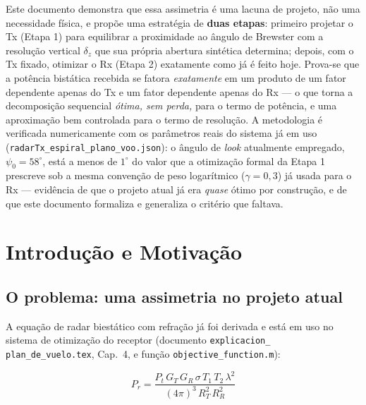 \documentclass[12pt,a4paper,oneside]{book}
\theoremstyle{definition}
\theoremstyle{remark}
\newcommand{\RT}{R_T}
\newcommand{\RR}{R_R}
\newcommand{\Prcv}{P_r}
\newcommand{\Pt}{P_t}
\newcommand{\dz}{\delta_z}
\begin{document}
Este documento demonstra que essa assimetria é uma lacuna de projeto, não uma
necessidade física, e propõe uma estratégia de \textbf{duas etapas}: primeiro
projetar o Tx (Etapa 1) para equilibrar a proximidade ao ângulo de Brewster
com a resolução vertical $\dz$ que sua própria abertura sintética determina;
depois, com o Tx fixado, otimizar o Rx (Etapa 2) exatamente como já é feito
hoje. Prova-se que a potência bistática recebida se fatora
\emph{exatamente} em um produto de um fator dependente apenas do Tx e um
fator dependente apenas do Rx — o que torna a decomposição sequencial
\emph{ótima, sem perda,} para o termo de potência, e uma aproximação bem
controlada para o termo de resolução. A metodologia é verificada
numericamente com os parâmetros reais do sistema já em uso
(\texttt{radarTx\_espiral\_plano\_voo.json}): o ângulo de \textit{look}
atualmente empregado, $\psi_0=58^\circ$, está a menos de $1^\circ$ do valor que a
otimização formal da Etapa 1 prescreve sob a mesma convenção de peso
logarítmico ($\gamma=0{,}3$) já usada para o Rx — evidência de que o projeto
atual já era \emph{quase} ótimo por construção, e de que este documento
formaliza e generaliza o critério que faltava.

\tableofcontents

\mainmatter

\chapter{Introdução e Motivação}

\section{O problema: uma assimetria no projeto atual}
\label{sec:motivacao}

A equação de radar biestático com refração já foi derivada e está em uso no
sistema de otimização do receptor (documento \texttt{explicacion\_\allowbreak
plan\_\allowbreak de\_\allowbreak vuelo.tex}, Cap.~4, e função
\texttt{objective\_\allowbreak function.m}):

\begin{equation}
  \boxed{\Prcv = \frac{\Pt\,G_T\,G_R\,\sigma\,T_1\,T_2\,\lambda^2}{(4\pi)^3\,\RT^2\,\RR^2}}
  \label{eq:radar_bistatico}
\end{equation}
\end{document}
